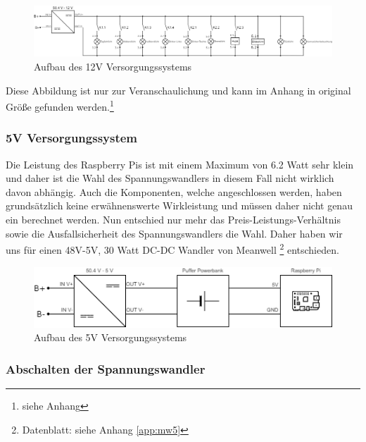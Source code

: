 \begin{figure}[H]
	\begin{center}
		\includegraphics[scale=0.4]{figures/hcis/versorgung_12V.png}
		\caption{Aufbau des 12V Versorgungssystems}
		\label{fig:12V_system}
	\end{center}
\end{figure}

Diese Abbildung ist nur zur Veranschaulichung und kann im Anhang in original Größe gefunden werden.\footnote{siehe Anhang}

\newpage

\subsubsection{5V Versorgungssystem}

Die Leistung des Raspberry Pis ist mit einem Maximum von 6.2 Watt sehr klein und daher ist die Wahl des Spannungswandlers in diesem Fall nicht wirklich davon abhängig. Auch die Komponenten, welche angeschlossen werden, haben grundsätzlich keine erwähnenswerte Wirkleistung und müssen daher nicht genau ein berechnet werden. Nun entschied nur mehr das Preis-Leistungs-Verhältnis sowie die Ausfallsicherheit des Spannungswandlers die Wahl. Daher haben wir uns für einen 48V-5V, 30 Watt DC-DC Wandler von Meanwell \footnote{Datenblatt: siehe Anhang \ref{app:mw5}} entschieden.

\begin{figure}[H]
	\begin{center}
		\includegraphics[scale=0.5]{figures/hcis/versorgung_5V.png}
		\caption{Aufbau des 5V Versorgungssystems}
		\label{fig:5V_system}
	\end{center}
\end{figure}

\subsubsection{Abschalten der Spannungswandler}

